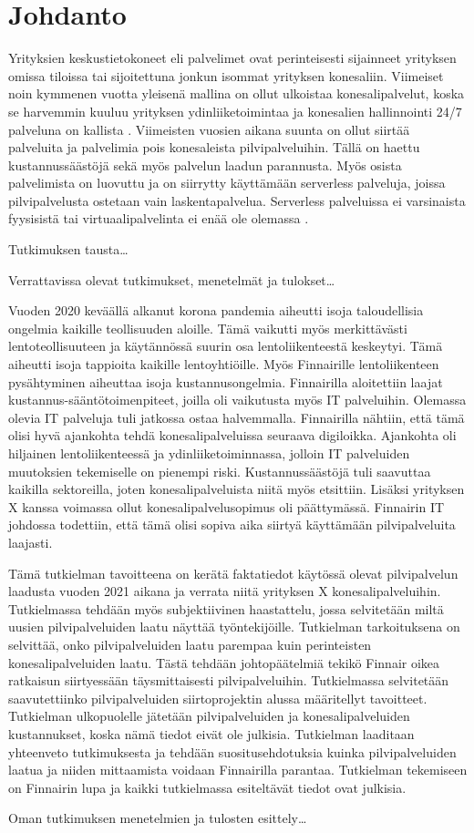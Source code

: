 \chapter{Johdanto\label{johdanto}}
Yrityksien keskustietokoneet eli palvelimet ovat perinteisesti sijainneet yrityksen omissa tiloissa tai sijoitettuna jonkun isommat yrityksen konesaliin. Viimeiset noin kymmenen vuotta yleisenä mallina on ollut ulkoistaa konesalipalvelut, koska se harvemmin kuuluu yrityksen ydinliiketoimintaa ja konesalien hallinnointi 24/7 palveluna on kallista \citep{data_center_outsourcing}. Viimeisten vuosien aikana suunta on ollut siirtää palveluita ja palvelimia pois konesaleista pilvipalveluihin. Tällä on haettu kustannussäästöjä sekä myös palvelun laadun parannusta. Myös osista palvelimista on luovuttu ja on siirrytty käyttämään serverless palveluja, joissa pilvipalvelusta ostetaan vain laskentapalvelua. Serverless palveluissa ei varsinaista fyysisistä tai virtuaalipalvelinta ei enää ole olemassa \citep{serverless_computing}.

Tutkimuksen tausta…

Verrattavissa olevat tutkimukset, menetelmät ja tulokset…


Vuoden 2020 keväällä alkanut korona pandemia aiheutti isoja taloudellisia ongelmia kaikille teollisuuden aloille. Tämä vaikutti myös merkittävästi lentoteollisuuteen ja käytännössä suurin osa lentoliikenteestä keskeytyi. Tämä aiheutti isoja tappioita kaikille lentoyhtiöille. Myös Finnairille lentoliikenteen pysähtyminen aiheuttaa isoja kustannusongelmia. Finnairilla aloitettiin laajat kustannus-sääntötoimenpiteet, joilla oli vaikutusta myös IT palveluihin. Olemassa olevia IT palveluja tuli jatkossa ostaa halvemmalla. Finnairilla nähtiin, että tämä olisi hyvä ajankohta tehdä konesalipalveluissa seuraava digiloikka. Ajankohta oli hiljainen lentoliikenteessä ja ydinliiketoiminnassa, jolloin IT palveluiden muutoksien tekemiselle on pienempi riski. Kustannussäästöjä tuli saavuttaa kaikilla sektoreilla, joten konesalipalveluista niitä myös etsittiin. Lisäksi yrityksen X kanssa voimassa ollut konesalipalvelusopimus oli päättymässä. Finnairin IT johdossa todettiin, että tämä olisi sopiva aika siirtyä käyttämään pilvipalveluita laajasti. \citep{finnair_use_ibm}

Tämä tutkielman tavoitteena on kerätä faktatiedot käytössä olevat pilvipalvelun laadusta vuoden 2021 aikana ja verrata niitä yrityksen X konesalipalveluihin. Tutkielmassa tehdään myös subjektiivinen haastattelu, jossa selvitetään miltä uusien pilvipalveluiden laatu näyttää työntekijöille. Tutkielman tarkoituksena on selvittää, onko pilvipalveluiden laatu parempaa kuin perinteisten konesalipalveluiden laatu. Tästä tehdään johtopäätelmiä tekikö Finnair oikea ratkaisun siirtyessään täysmittaisesti pilvipalveluihin. Tutkielmassa selvitetään saavutettiinko pilvipalveluiden siirtoprojektin alussa määritellyt tavoitteet. Tutkielman ulkopuolelle jätetään pilvipalveluiden ja konesalipalveluiden kustannukset, koska nämä tiedot eivät ole julkisia. Tutkielman laaditaan yhteenveto tutkimuksesta ja tehdään suositusehdotuksia kuinka pilvipalveluiden laatua ja niiden mittaamista voidaan Finnairilla parantaa. Tutkielman tekemiseen on Finnairin lupa ja kaikki tutkielmassa esiteltävät tiedot ovat julkisia.

Oman tutkimuksen menetelmien ja tulosten esittely…

